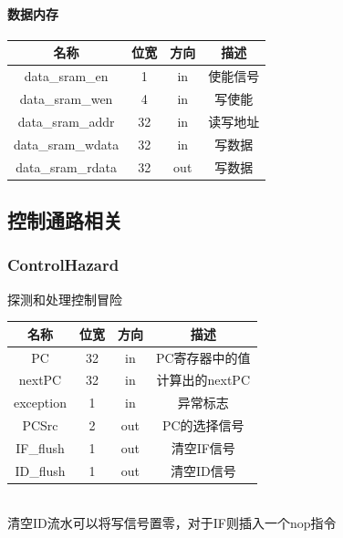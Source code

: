 \documentclass[UTF8]{ctexart}
\begin{document}
\paragraph{数据内存}
\begin{table}[h]
    \centering
    \begin{tabular}{|c|c|c|c|}
        \hline  
        名称 & 位宽 & 方向 & 描述 \\ \hline
        data\_sram\_en & 1 & in & 使能信号 \\ \hline 
        data\_sram\_wen& 4 & in & 写使能 \\ \hline 
        data\_sram\_addr & 32 & in & 读写地址 \\ \hline 
        data\_sram\_wdata & 32 & in & 写数据 \\ \hline 
        data\_sram\_rdata & 32 & out & 写数据 \\ \hline
    \end{tabular}
\end{table}
\subsection{控制通路相关}
\subsubsection{ControlHazard}
探测和处理控制冒险
\begin{table}[h]
    \centering
    \begin{tabular}{|c|c|c|c|}
        \hline  
        名称 & 位宽 & 方向 & 描述 \\ \hline
        PC & 32 & in & PC寄存器中的值 \\ \hline
        nextPC & 32 & in & 计算出的nextPC \\ \hline
        exception & 1 & in & 异常标志 \\ \hline 
        PCSrc & 2 & out & PC的选择信号 \\ \hline 
        IF\_flush & 1 & out & 清空IF信号 \\ \hline 
        ID\_flush & 1 & out & 清空ID信号 \\ \hline
    \end{tabular}
\end{table}\\
清空ID流水可以将写信号置零，对于IF则插入一个nop指令
\end{document}
